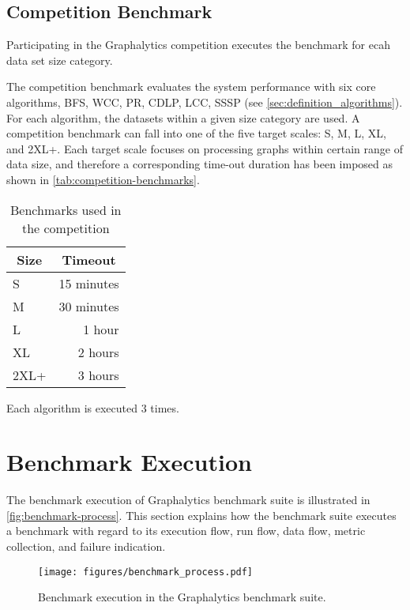 \subsection{Competition Benchmark}
\label{sec:process:type:standard}
Participating in the Graphalytics competition executes the benchmark for ecah data set size category.

The competition benchmark evaluates the system performance with six core algorithms, BFS, WCC, PR, CDLP, LCC, SSSP (see \autoref{sec:definition_algorithms}). For each algorithm, the datasets within a given size category are used. A competition benchmark can fall into one of the five target scales: S, M, L, XL, and 2XL+. Each target scale focuses on processing graphs within certain range of data size, and therefore a corresponding time-out duration has been imposed as shown in \autoref{tab:competition-benchmarks}.

\begin{table}[htbp]
	\centering
	\begin{tabular}{|l|r|}
		\hline
		\multicolumn{1}{|c|}{\bf Size} & \multicolumn{1}{c|}{\bf Timeout} \\
		\hline
		S          & 15 minutes    \\
		M          & 30 minutes    \\
		L          & 1 hour        \\
		XL         & 2 hours       \\
		2XL+       & 3 hours       \\
		\hline
	\end{tabular}
	\caption{Benchmarks used in the competition}
	\label{tab:competition-benchmarks}
\end{table}

Each algorithm is executed 3 times.

\section{Benchmark Execution}
\label{sec:process:execution}
The benchmark execution of Graphalytics benchmark suite is illustrated in \autoref{fig:benchmark-process}. This section explains how the benchmark suite executes a benchmark with regard to its execution flow, run flow, data flow, metric collection, and failure indication.

\begin{figure}[h]
 	\centering
 	\texttt{[image: figures/benchmark\_process.pdf]}
 	\caption{Benchmark execution in the Graphalytics benchmark suite.}
 	\label{fig:benchmark-process}
\end{figure}


